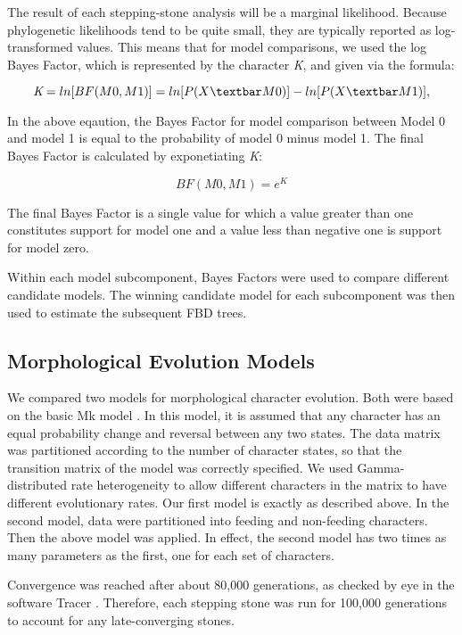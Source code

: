 \documentclass{article}
\begin{document}
The result of each stepping-stone analysis will be a marginal likelihood.
Because phylogenetic likelihoods tend to be quite small, they are typically reported as log-transformed values.
This means that for model comparisons, we used the log Bayes Factor, which is represented by the character \textit{K}, and given via the formula:

\begin{center}
  \[  \textit{K}=ln[BF(M0,M1)]=ln[P(X \textbar M0)] - ln[P(X \textbar M1)],  \]
\end{center}    
    
In the above eqaution, the Bayes Factor for model comparison between Model 0 and model 1 is equal to the probability of model 0 minus model 1. The final Bayes Factor is calculated by exponetiating \textit{K}:

\begin{center}
  \[  BF(M0,M1)=\textit{e}^\textit{K} \]
\end{center}

The final Bayes Factor is a single value for which a value greater than one constitutes support for model one and a value less than negative one is support for model zero. 

 Within each model subcomponent, Bayes Factors were used to compare different candidate models. 
The winning candidate model for each subcomponent was then used to estimate the subsequent FBD trees.

\subsection{Morphological Evolution Models}

We compared two models for morphological character evolution. 
Both were based on the basic Mk model \citep{Lewis2001}. 
In this model, it is assumed that any character has an equal probability change and reversal between any two states. 
The data matrix was partitioned according to the number of character states, so that the transition matrix of the model was correctly specified.
We used Gamma-distributed rate heterogeneity to allow different characters in the matrix to have different evolutionary rates.
Our first model is exactly as described above. 
In the second model, data were partitioned into feeding and non-feeding characters.
Then the above model was applied.
In effect, the second model has two times as many parameters as the first, one for each set of characters.

Convergence was reached after about 80,000 generations, as checked by eye in the software Tracer \citep{Rambaut2018}. 
Therefore, each stepping stone was run for 100,000 generations to account for any late-converging stones.
\end{document}
